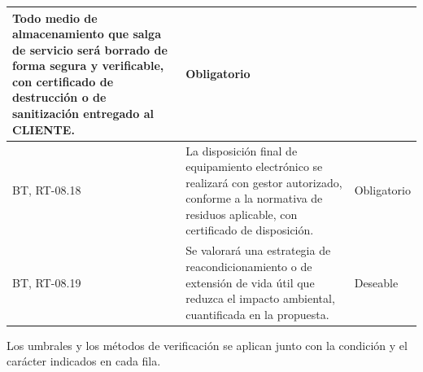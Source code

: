 \begin{longtable}{|L{0.098425\AnchoTablaAnexo}|L{0.814961\AnchoTablaAnexo}|L{0.086614\AnchoTablaAnexo}|}
Todo medio de almacenamiento que salga de servicio será borrado de forma segura y verificable, con certificado de destrucción o de sanitización entregado al CLIENTE. &
Obligatorio \\ \hline
BT, RT-08.18 &
La disposición final de equipamiento electrónico se realizará con gestor autorizado, conforme a la normativa de residuos aplicable, con certificado de disposición. &
Obligatorio \\ \hline
{}
BT, RT-08.19 &
Se valorará una estrategia de reacondicionamiento o de extensión de vida útil que reduzca el impacto ambiental, cuantificada en la propuesta. &
Deseable \\ \hline
\end{longtable}

Los umbrales y los métodos de verificación se aplican junto con la condición y el carácter indicados en cada fila.
